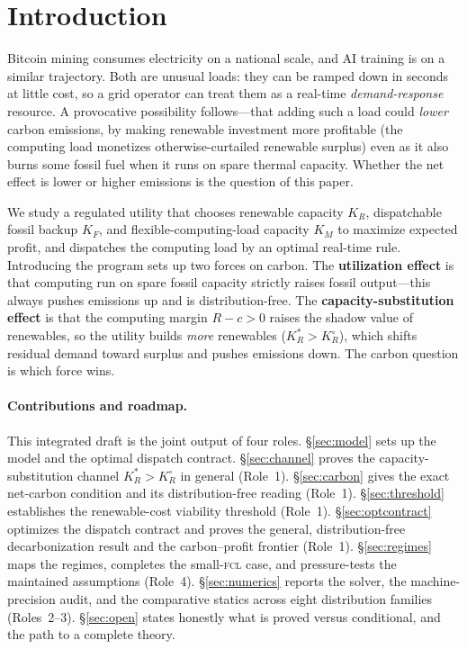 \documentclass[11pt,reqno]{amsart}
\theoremstyle{plain}
\theoremstyle{definition}\newtheorem{condition}{Condition}\newtheorem{assumption}{Assumption}
\theoremstyle{remark}\newtheorem{remark}{Remark}
\newcommand{\KR}{K_R}\newcommand{\KF}{K_F}\newcommand{\KM}{K_M}
\newcommand{\KRs}{K_R^{*}}\newcommand{\KFs}{K_F^{*}}\newcommand{\KMs}{K_M^{*}}
\newcommand{\KRo}{K_R^{\circ}}\newcommand{\KFo}{K_F^{\circ}}
\begin{document}
\section{Introduction}\label{sec:intro}

Bitcoin mining consumes electricity on a national scale, and AI training is on a
similar trajectory. Both are unusual loads: they can be ramped down in seconds at
little cost, so a grid operator can treat them as a real-time \emph{demand-response}
resource. A provocative possibility follows---that adding such a load could
\emph{lower} carbon emissions, by making renewable investment more profitable (the
computing load monetizes otherwise-curtailed renewable surplus) even as it also
burns some fossil fuel when it runs on spare thermal capacity. Whether the net
effect is lower or higher emissions is the question of this paper.

We study a regulated utility that chooses renewable capacity $\KR$, dispatchable
fossil backup $\KF$, and flexible-computing-load capacity $\KM$ to maximize
expected profit, and dispatches the computing load by an optimal real-time rule.
Introducing the program sets up two forces on carbon. The \textbf{utilization
effect} is that computing run on spare fossil capacity strictly raises fossil
output---this always pushes emissions up and is distribution-free. The
\textbf{capacity-substitution effect} is that the computing margin $R-c>0$ raises
the shadow value of renewables, so the utility builds \emph{more} renewables
($\KRs>\KRo$), which shifts residual demand toward surplus and pushes emissions
down. The carbon question is which force wins.

\paragraph{Contributions and roadmap.} This integrated draft is the joint output
of four roles. \S\ref{sec:model} sets up the model and the optimal dispatch
contract. \S\ref{sec:channel} proves the capacity-substitution channel
$\KRs>\KRo$ in general (Role~1). \S\ref{sec:carbon} gives the exact net-carbon
condition and its distribution-free reading (Role~1). \S\ref{sec:threshold}
establishes the renewable-cost viability threshold (Role~1).
\S\ref{sec:optcontract} optimizes the dispatch contract and proves the general,
distribution-free decarbonization result and the carbon--profit frontier (Role~1).
\S\ref{sec:regimes} maps the regimes, completes the small-\textsc{fcl} case, and
pressure-tests the maintained assumptions (Role~4). \S\ref{sec:numerics} reports
the solver, the machine-precision audit, and the comparative statics across eight
distribution families (Roles~2--3). \S\ref{sec:open} states honestly what is
proved versus conditional, and the path to a complete theory.
\end{document}
